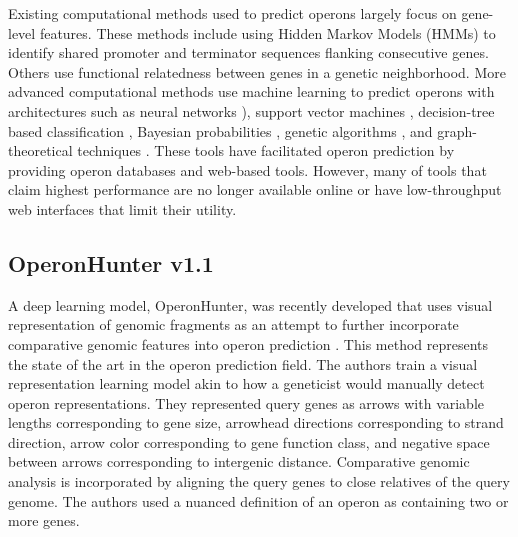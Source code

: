 \documentclass{article}
\begin{document}
Existing computational methods used to predict operons largely focus on gene-level features. These methods include using Hidden Markov Models (HMMs) to identify shared promoter and terminator sequences flanking consecutive genes. Others use functional relatedness between genes in a genetic neighborhood. More advanced computational methods use machine learning to predict operons with architectures such as neural networks \cite{chen_2004,tran_2007}), support vector machines \cite{zhang_2006}, decision-tree based classification \cite{dam_2007}, Bayesian probabilities \cite{bockhorst_2003, edwards_2005, westover_2005}, genetic algorithms \cite{jacob_2005}, and graph-theoretical techniques \cite{zheng_2002,edwards_2005}. These tools have facilitated operon prediction by providing operon databases and web-based tools. However, many of tools that claim highest performance are no longer available online or have low-throughput web interfaces that limit their utility.

\subsection{OperonHunter v1.1}

A deep learning model, OperonHunter, was recently developed that uses visual representation of genomic fragments as an attempt to further incorporate comparative genomic features into operon prediction \cite{assaf_detecting_2021}. This method represents the state of the art in the operon prediction field. The authors train a visual representation learning model akin to how a geneticist would manually detect operon representations. They represented query genes as arrows with variable lengths corresponding to gene size, arrowhead directions corresponding to strand direction, arrow color corresponding to gene function class, and negative space between arrows corresponding to intergenic distance. Comparative genomic analysis is incorporated by aligning the query genes to close relatives of the query genome. The authors used a nuanced definition of an operon as containing two or more genes.
\end{document}
